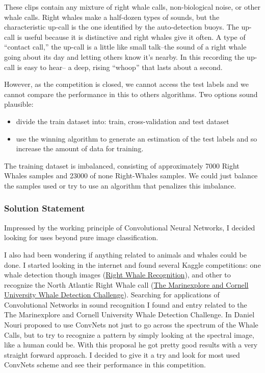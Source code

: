 \documentclass[]{article}
\newcommand{\competition}{The Marinexplore and Cornell University Whale Detection Challenge}
\begin{document}
These clips contain any mixture of right whale calls, non-biological noise, or other whale calls. Right whales make a half-dozen types of sounds, but the characteristic up-call is the one identified by the auto-detection buoys. The up-call is useful because it is distinctive and right whales give it often. A type of “contact call,” the up-call is a little like small talk--the sound of a right whale going about its day and letting others know it’s nearby. In this recording the up-call is easy to hear-- a deep, rising “whoop” that lasts about a second.


However, as the competition is closed, we cannot access the test labels and we cannot compare the performance in this  to others algorithms. Two options sound plausible:
\begin{itemize}
	\item divide the train dataset into: train, cross-validation and test dataset
	\item use the winning algorithm to generate an estimation of the test labels and so increase the amount of data for training.
\end{itemize}

The training dataset is imbalanced, consisting of approximately 7000 Right Whales samples and 23000 of none Right-Whales samples. We could just balance the samples used or try to use an algorithm that penalizes this imbalance.

\subsubsection{Solution Statement}\label{solution-statement}
Impressed by the working principle of Convolutional Neural Networks, I decided looking for uses beyond pure image classification. 

I also had been wondering if anything related to animals and whales could be done. I started looking in the internet and found several Kaggle competitions: one whale detection though images (\href{https://www.kaggle.com/c/noaa-right-whale-recognition}{Right Whale Recognition}), and other to recognize the North Atlantic Right Whale call (\href{https://www.kaggle.com/c/whale-detection-challenge}{\competition}). Searching for applications of Convolutional Networks in sound recognition I found and entry related to the \competition. In \cite{Nouriblog} Daniel Nouri proposed to use ConvNets not just to go across the spectrum of the Whale Calls, but to try to recognize a pattern by simply looking at the spectral image, like a human could be. With this proposal he got pretty good results with a very straight forward approach. I decided to give it a try and look for most used ConvNets scheme and see their performance in this competition.
\end{document}
